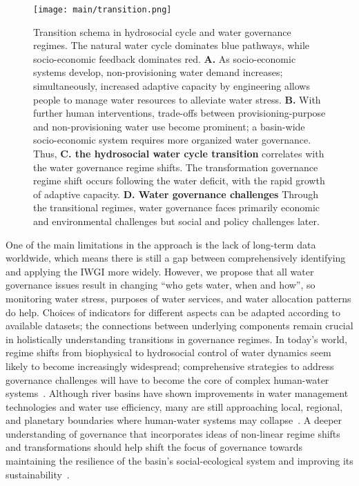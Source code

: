 \documentclass[draft]{../agujournal2019}
\begin{document}
\begin{figure*}[htbp!]
	\centering
	\texttt{[image: main/transition.png]}
	\caption{
		Transition schema in hydrosocial cycle and water governance regimes. The natural water cycle dominates blue pathways, while socio-economic feedback dominates red.
		\textbf{A.} As socio-economic systems develop, non-provisioning water demand increases; simultaneously, increased adaptive capacity by engineering allows people to manage water resources to alleviate water stress.
		\textbf{B.} With further human interventions, trade-offs between provisioning-purpose and non-provisioning water use become prominent; a basin-wide socio-economic system requires more organized water governance.
		Thus, \textbf{C. the hydrosocial water cycle transition} correlates with the water governance regime shifts. The transformation governance regime shift occurs following the water deficit, with the rapid growth of adaptive capacity.
		\textbf{D. Water governance challenges} Through the transitional regimes, water governance faces primarily economic and environmental challenges but social and policy challenges later.
	}\label{fig:summary}
\end{figure*}


One of the main limitations in the approach is the lack of long-term data worldwide, which means there is still a gap between comprehensively identifying and applying the IWGI more widely.
However, we propose that all water governance issues result in changing ``who gets water, when and how'', so monitoring water stress, purposes of water services, and water allocation patterns do help.
Choices of indicators for different aspects can be adapted according to available datasets; the connections between underlying components remain crucial in holistically understanding transitions in governance regimes.
In today's world, regime shifts from biophysical to hydrosocial control of water dynamics seem likely to become increasingly widespread; comprehensive strategies to address governance challenges will have to become the core of complex human-water systems~\cite{cumming2018,cumming2014,jaeger2019}.
Although river basins have shown improvements in water management technologies and water use efficiency, many are still approaching local, regional, and planetary boundaries where human-water systems may collapse~\cite{gleeson2020, wang-erlandsson2022}.
A deeper understanding of governance that incorporates ideas of non-linear regime shifts and transformations should help shift the focus of governance towards maintaining the resilience of the basin’s social-ecological system and improving its sustainability~\cite{falkenmark2019}.
\end{document}
